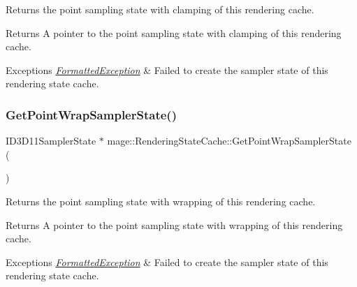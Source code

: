 Returns the point sampling state with clamping of this rendering cache.

\begin{DoxyReturn}{Returns}
A pointer to the point sampling state with clamping of this rendering cache. 
\end{DoxyReturn}

\begin{DoxyExceptions}{Exceptions}
{\em \hyperlink{structmage_1_1_formatted_exception}{Formatted\+Exception}} & Failed to create the sampler state of this rendering state cache. \\
\hline
\end{DoxyExceptions}
\hypertarget{structmage_1_1_rendering_state_cache_a4d1b6eef773700e3fb80195f93b484f9}{}\label{structmage_1_1_rendering_state_cache_a4d1b6eef773700e3fb80195f93b484f9} 
\subsubsection{\texorpdfstring{Get\+Point\+Wrap\+Sampler\+State()}{GetPointWrapSamplerState()}}
{\footnotesize\ttfamily I\+D3\+D11\+Sampler\+State $\ast$ mage\+::\+Rendering\+State\+Cache\+::\+Get\+Point\+Wrap\+Sampler\+State (\begin{DoxyParamCaption}{ }\end{DoxyParamCaption})}

Returns the point sampling state with wrapping of this rendering cache.

\begin{DoxyReturn}{Returns}
A pointer to the point sampling state with wrapping of this rendering cache. 
\end{DoxyReturn}

\begin{DoxyExceptions}{Exceptions}
{\em \hyperlink{structmage_1_1_formatted_exception}{Formatted\+Exception}} & Failed to create the sampler state of this rendering state cache. \\
\hline
\end{DoxyExceptions}
\hypertarget{structmage_1_1_rendering_state_cache_a86d51235df703c952a1e50d95eae4244}{}\label{structmage_1_1_rendering_state_cache_a86d51235df703c952a1e50d95eae4244} 
